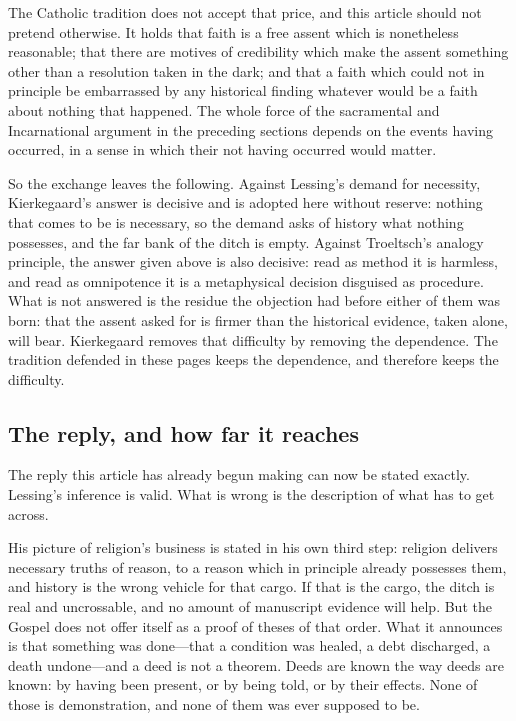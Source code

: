 The Catholic tradition does not accept that price, and this article should not pretend otherwise. It holds that faith is a free assent which is nonetheless reasonable; that there are motives of credibility which make the assent something other than a resolution taken in the dark; and that a faith which could not in principle be embarrassed by any historical finding whatever would be a faith about nothing that happened. The whole force of the sacramental and Incarnational argument in the preceding sections depends on the events having occurred, in a sense in which their not having occurred would matter.

So the exchange leaves the following. Against Lessing's demand for necessity, Kierkegaard's answer is decisive and is adopted here without reserve: nothing that comes to be is necessary, so the demand asks of history what nothing possesses, and the far bank of the ditch is empty. Against Troeltsch's analogy principle, the answer given above is also decisive: read as method it is harmless, and read as omnipotence it is a metaphysical decision disguised as procedure. What is not answered is the residue the objection had before either of them was born: that the assent asked for is firmer than the historical evidence, taken alone, will bear. Kierkegaard removes that difficulty by removing the dependence. The tradition defended in these pages keeps the dependence, and therefore keeps the difficulty.

\subsection{The reply, and how far it reaches}

The reply this article has already begun making can now be stated exactly. Lessing's inference is valid. What is wrong is the description of what has to get across.

His picture of religion's business is stated in his own third step: religion delivers necessary truths of reason, to a reason which in principle already possesses them, and history is the wrong vehicle for that cargo. If that is the cargo, the ditch is real and uncrossable, and no amount of manuscript evidence will help. But the Gospel does not offer itself as a proof of theses of that order. What it announces is that something was done---that a condition was healed, a debt discharged, a death undone---and a deed is not a theorem. Deeds are known the way deeds are known: by having been present, or by being told, or by their effects. None of those is demonstration, and none of them was ever supposed to be.

